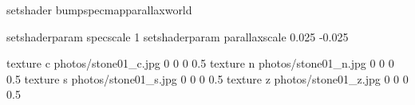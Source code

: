 setshader bumpspecmapparallaxworld

setshaderparam specscale 1
setshaderparam parallaxscale 0.025 -0.025

texture c photos/stone01_c.jpg 0 0 0 0.5
texture n photos/stone01_n.jpg 0 0 0 0.5
texture s photos/stone01_s.jpg 0 0 0 0.5
texture z photos/stone01_z.jpg 0 0 0 0.5
